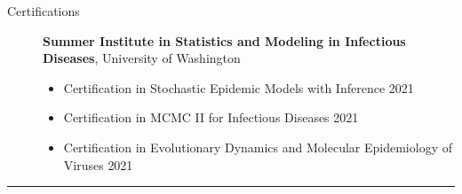 \documentclass{article}
\begin{document}
	\begin{description}
		\vspace{-2mm}
		\item[Certifications]\hspace*{.01in}
		
		\textbf{Summer Institute in Statistics and Modeling in Infectious Diseases}, University of Washington
		
		\begin{itemize}
			\item Certification in Stochastic Epidemic Models with Inference  \hfill{2021}
			\item Certification in MCMC II for Infectious Diseases \hfill{2021}
			\item Certification in Evolutionary Dynamics and Molecular Epidemiology of Viruses \hfill{2021}
		\end{itemize}
	\end{description}
	\vspace{-2mm}
	\rule{\linewidth}{1pt}
	
	
	
\end{document}
